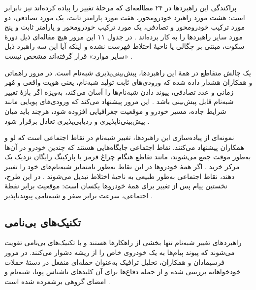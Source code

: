 پراکندگی این راهبردها در ۲۴ مطالعه‌ای که مرحلهٔ تغییر را پیاده کرده‌اند نیز نابرابر است: هشت مورد راهبرد خودرومحور، هفت مورد پارامتر ثابت، یک مورد تصادفی، دو مورد ترکیب خودرومحور و تصادفی، یک مورد ترکیب خودرومحور و پارامتر ثابت و پنج مورد سایر راهبردها را به کار برده‌اند \cite{rahmawatiagustinaSystematicLiteratureReview2025}. در جدول ۱۱ این مرور هیچ مقاله‌ای ذیل دورهٔ سکوت، مبتنی بر چگالی یا ناحیهٔ اختلاط فهرست نشده و اینکه آیا این سه راهبرد ذیل «سایر موارد» قرار گرفته‌اند مشخص نیست \cite{rahmawatiagustinaSystematicLiteratureReview2025}.

یک چالش متقاطع در همهٔ این راهبردها، پیش‌بینی‌پذیری شبه‌نام است. در مرور راهماتی و همکاران هشدار داده شده که ورودی‌های ثابت تولید شبه‌نام، یعنی هویت واقعی و مُهر زمانی و عدد تصادفی، پیوند دادن شبه‌نام‌ها را آسان می‌کند، به‌ویژه اگر بازهٔ تغییر شبه‌نام قابل پیش‌بینی باشد \cite{rahmawatiagustinaSystematicLiteratureReview2025}. این مرور پیشنهاد می‌کند که ورودی‌های پویایی مانند شرایط جاده، مسیر خودرو و موقعیت جغرافیایی افزوده شود، هرچند باید میان پیش‌بینی‌ناپذیری و ردیابی‌پذیری تعادل برقرار شود \cite{rahmawatiagustinaSystematicLiteratureReview2025}.

نمونه‌ای از پیاده‌سازی این راهبردها، تغییر شبه‌نام در نقاط اجتماعی است که لو و همکاران پیشنهاد می‌کنند. نقاط اجتماعی جایگاه‌هایی هستند که چندین خودرو در آن‌ها به‌طور موقت جمع می‌شوند، مانند تقاطع هنگام چراغ قرمز یا پارکینگ رایگان نزدیک یک مرکز خرید \cite{luPseudonymChangingSocial2012}. اگر همهٔ خودروها در این نقاط به‌طور نامتمایز شبه‌نام‌های خود را تغییر دهند، نقاط اجتماعی به‌طور طبیعی به ناحیهٔ اختلاط تبدیل می‌شوند \cite{luPseudonymChangingSocial2012}. در این طرح، نخستین پیام پس از تغییر برای همهٔ خودروها یکسان است: موقعیت برابر نقطهٔ اجتماعی، سرعت برابر صفر و شبه‌نامی پیوندناپذیر \cite{luPseudonymChangingSocial2012}.

\subsection{تکنیک‌های بی‌نامی}

راهبردهای تغییر شبه‌نام تنها بخشی از راهکارها هستند و با تکنیک‌های بی‌نامی تقویت می‌شوند که پیوند پیام‌ها به یک خودروی خاص را از ریشه دشوار می‌کنند. در مرور فرسیمادان و همکاران، تحلیل ترافیک به‌عنوان حمله‌ای منفعل در دستهٔ حملات خودخواهانه بررسی شده و از جمله دفاع‌ها برای آن کلیدهای ناشناس پویا، شبه‌نام و امضای گروهی برشمرده شده است \cite{farsimadanReviewSecurityChallenges2025}.

